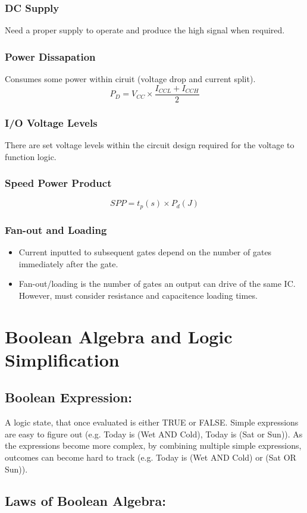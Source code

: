 \documentclass[a5paper]{article}
\begin{document}
	\subsubsection{DC Supply}
	Need a proper supply to operate and produce the high signal when required.
	\subsubsection{Power Dissapation}
	Consumes some power within ciruit (voltage drop and current split).
	$$P_{D}=V_{CC}\times\frac{I_{CCL}+I_{CCH}}{2}$$
	\subsubsection{I/O Voltage Levels}
	There are set voltage levels within the circuit design required for the voltage to function logic.
	\subsubsection{Speed Power Product}
	$$SPP=t_{p}(s)\times P_{d}(J)$$
	\subsubsection{Fan-out and Loading}
	\begin{itemize}
		\item Current inputted to subsequent gates depend on the number of gates immediately after the gate.
		\item Fan-out/loading is the number of gates an output can drive of the same IC. However, must consider resistance and capacitence loading times.
	\end{itemize}

	\section{Boolean Algebra and Logic Simplification}
	\subsection{Boolean Expression:}
	A logic state, that once evaluated is either TRUE or FALSE. Simple expressions are easy to figure out (e.g. Today is (Wet AND Cold), Today is (Sat or Sun)). As the expressions become more complex, by combining multiple simple expressions, outcomes can become hard to track (e.g. Today is (Wet AND Cold) or (Sat OR Sun)).

	\subsection{Laws of Boolean Algebra:}
\end{document}
